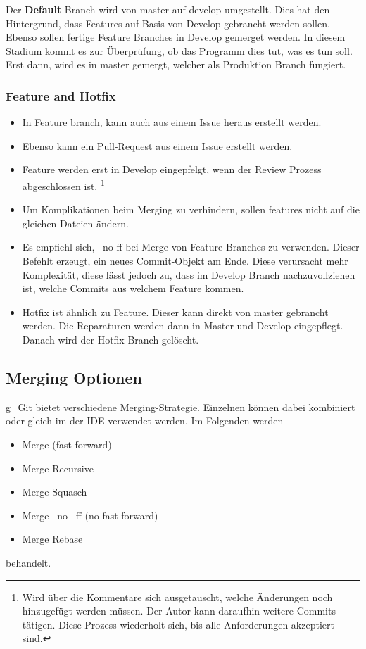 Der \textbf{Default} Branch wird von master auf develop umgestellt. Dies hat den Hintergrund, dass Features auf Basis von Develop gebrancht werden sollen. Ebenso sollen fertige Feature Branches in Develop gemerget werden. In diesem Stadium kommt es zur Überprüfung, ob das Programm dies tut, was es tun soll. Erst dann, wird es in master gemergt, welcher als Produktion Branch fungiert.

\subsubsection{Feature and Hotfix}
\begin{itemize}
	\item In Feature branch, kann auch aus einem Issue heraus erstellt werden.
	\item Ebenso kann ein Pull-Request aus einem Issue erstellt werden.
	\item Feature werden erst in Develop eingepfelgt, wenn der Review Prozess abgeschlossen ist. \footnote{Wird über die Kommentare sich ausgetauscht, welche Änderungen noch hinzugefügt werden müssen. Der Autor kann daraufhin weitere Commits tätigen. Diese Prozess wiederholt sich, bis alle Anforderungen akzeptiert sind.}
	\item Um Komplikationen beim Merging zu verhindern, sollen features nicht auf die gleichen Dateien ändern.
	\item Es empfiehl sich, --no-ff bei Merge von Feature Branches zu verwenden. Dieser Befehlt erzeugt, ein neues Commit-Objekt am Ende. Diese verursacht mehr Komplexität, diese lässt jedoch zu, dass im Develop Branch nachzuvollziehen ist, welche Commits aus welchem Feature kommen.
	\item Hotfix ist ähnlich zu Feature. Dieser kann direkt von master gebrancht werden. Die Reparaturen werden dann in Master und Develop eingepflegt. Danach wird der Hotfix Branch gelöscht.
\end{itemize}


\subsection{Merging Optionen}
\gls{g_Git} bietet verschiedene Merging-Strategie. Einzelnen können dabei kombiniert oder gleich im der \gls{IDE} verwendet werden.
Im Folgenden werden 
\begin{itemize}
	\item Merge (fast forward)
	\item Merge Recursive
	\item Merge Squasch
	\item Merge --no --ff (no fast forward)
	\item Merge Rebase
\end{itemize}
behandelt.

